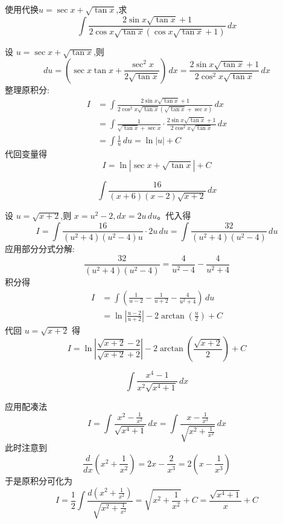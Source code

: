 \begin{questions}
    \question 使用代换$u = \sec x + \sqrt{\tan x}$,求
    \[
    \int \frac{2 \sin x \sqrt{\tan x} + 1}{2 \cos x \sqrt{\tan x} (\cos x \sqrt{\tan x} + 1)} \, dx
    \]
    \begin{solution}
        设 $u = \sec x + \sqrt{\tan x}$,则
        \[
        du = \left( \sec x \tan x + \frac{\sec^2 x}{2\sqrt{\tan x}} \right) \, dx = \frac{2\sin x \sqrt{\tan x} + 1}{2\cos^2 x \sqrt{\tan x}} \, dx
        \]
        整理原积分:
        \begin{align*}
        I &= \int \frac{2\sin x \sqrt{\tan x} + 1}{2\cos^2 x \sqrt{\tan x} (\sqrt{\tan x} + \sec x)} \, dx \\
        &= \int \frac{1}{\sqrt{\tan x} + \sec x} \cdot \frac{2\sin x \sqrt{\tan x} + 1}{2\cos^2 x \sqrt{\tan x}} \, dx \\
        &= \int \frac{1}{u} \, du = \ln|u| + C
        \end{align*}
        代回变量得 
        \[
        I = \ln|\sec x + \sqrt{\tan x}| + C
        \]
    \end{solution}

    \question 
    \[
    \int \frac{16}{(x+6)(x-2)\sqrt{x+2}} \, dx
    \]
    \begin{solution}
        设 $u = \sqrt{x+2}$,则 $x = u^2-2, dx = 2u\,du$。代入得
        \[
        I = \int \frac{16}{(u^2+4)(u^2-4)u} \cdot 2u\,du = \int \frac{32}{(u^2+4)(u^2-4)}\,du
        \]
        应用部分分式分解:
        \[
        \frac{32}{(u^2+4)(u^2-4)} = \frac{4}{u^2-4} - \frac{4}{u^2+4}
        \]
        积分得
        \begin{align*}
        I &= \int \left( \frac{1}{u-2} - \frac{1}{u+2} - \frac{4}{u^2+4} \right) \,du \\
        &= \ln\left| \frac{u-2}{u+2} \right| - 2\arctan\left( \frac{u}{2} \right) + C
        \end{align*}
        代回 $u = \sqrt{x+2}$ 得
        \[
        I = \ln\left| \frac{\sqrt{x+2}-2}{\sqrt{x+2}+2} \right| - 2\arctan\left( \frac{\sqrt{x+2}}{2} \right) + C
        \]
    \end{solution}

    

    \question 
    \[
    \int \frac{x^4 - 1}{x^2 \sqrt{x^4 + 1}} \, dx
    \]
    \begin{solution}
        应用配凑法
        \[
        I = \int \frac{x^2 - \frac{1}{x^2}}{\sqrt{x^4 + 1}} \, dx = \int \frac{x - \frac{1}{x^3}}{\sqrt{x^2 + \frac{1}{x^2}}} \, dx
        \]
        此时注意到
        \[
        \frac{d}{dx}\left(x^2 + \frac{1}{x^2}\right) = 2x - \frac{2}{x^3} = 2\left(x - \frac{1}{x^3}\right)
        \]
        于是原积分可化为
        \[
        I = \frac{1}{2} \int \frac{d(x^2 + \frac{1}{x^2})}{\sqrt{x^2 + \frac{1}{x^2}}}
        = \sqrt{x^2 + \frac{1}{x^2}} + C
        = \frac{\sqrt{x^4 + 1}}{x} + C
        \]
    \end{solution}


\end{questions}
